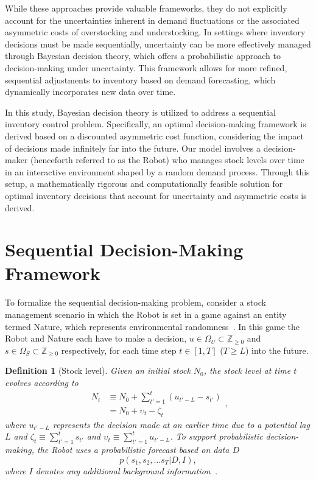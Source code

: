 \documentclass[a4paper,12pt]{article}
\newtheorem{definition}{Definition}
\begin{document}
	While these approaches provide valuable frameworks, they do not explicitly account for the uncertainties inherent in demand fluctuations or the associated asymmetric costs of overstocking and understocking. In settings where inventory decisions must be made sequentially, uncertainty can be more effectively managed through Bayesian decision theory, which offers a probabilistic approach to decision-making under uncertainty. This framework allows for more refined, sequential adjustments to inventory based on demand forecasting, which dynamically incorporates new data over time.
	
	In this study, Bayesian decision theory is utilized to address a sequential inventory control problem. Specifically, an optimal decision-making framework is derived based on a discounted asymmetric cost function, considering the impact of decisions made infinitely far into the future. Our model involves a decision-maker (henceforth referred to as the Robot) who manages stock levels over time in an interactive environment shaped by a random demand process. Through this setup, a mathematically rigorous and computationally feasible solution for optimal inventory decisions that account for uncertainty and asymmetric costs is derived.
	
	\section{Sequential Decision-Making Framework}
	To formalize the sequential decision-making problem, consider a stock management scenario in which the Robot is set in a game against an entity termed Nature, which represents environmental randomness~\citep{lavalle2006}. In this game the Robot and Nature each have to make a decision, $u\in \Omega_U\subset \mathbb{Z}_{\geq 0}$ and $s\in \Omega_S\subset \mathbb{Z}_{\geq 0}$ respectively, for each time step $t\in [1,T]$ ($T\geq L$) into the future. 
	\begin{definition}[Stock level]
		\label{def:stock}
		Given an initial stock $N_0$, the stock level at time $t$ evolves according to
		\begin{equation}
			\begin{split}
				N_t &\equiv N_0 + \sum_{t'=1}^{t} (u_{t'-L} - s_{t'})\\
				& = N_0+\upsilon_t-\zeta_t
			\end{split},
		\end{equation}
		where $u_{t'-L}$ represents the decision made at an earlier time due to a potential lag $L$ and $\zeta_t\equiv \sum_{t'=1}^ts_{t'}$ and $\upsilon_t\equiv \sum_{t'=1}^tu_{t'-L}$. To support probabilistic decision-making, the Robot uses a probabilistic forecast based on data $D$
		\begin{equation}
			p(s_1, s_2, \dots s_T| D, I),
		\end{equation}
		where $I$ denotes any additional background information~\citep{Sivia2006}.
	\end{definition}
\end{document}
